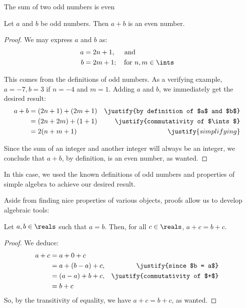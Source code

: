 \begin{expl}{The sum of two odd numbers is even}
\begin{theorem}
  Let $a$ and $b$ be odd numbers. Then $a + b$ is an even number.
\end{theorem}
\begin{proof}
We may express $a$ and $b$ as:
\begin{align*}
  a &= 2n + 1, \quad \text{ and}   \\
  b &= 2m + 1; \quad \text{for } n,m \in \ints
\end{align*}

This comes from the definitions of odd numbers. As a verifying example,
$a = -7, b = 3$ if $n = -4$ and $m = 1$. Adding $a$ and $b$, we immediately get
the desired result:
\begin{align*}
  a + b &= (2n + 1) + (2m + 1) 	& \justify{by definition of $a$ and $b$} \\
        &= (2n + 2m) + (1 + 1)  & \justify{commutativity of $\ints$} \\
        &= 2(n+m+1)				& \justify{simplifying}
\end{align*}

Since the sum of an integer and another integer will always be an integer,
we conclude that $a+b$, by definition, is an even number, as wanted.

\end{proof}

\end{expl}

In this case, we used the known definitions of odd numbers and properties of
simple algebra to achieve our desired result.


Aside from finding nice properties of various objects, proofs allow us
to develop algebraic tools:
\begin{theorem}
  Let $a, b \in \reals$ such that $a = b$. Then, for all $c \in \reals$,
  $a + c = b + c$.
\end{theorem}
\begin{proof} We deduce:
  \begin{align}
    a + c &= a + 0 + c \\
          &= a + (b - a) + c, & \justify{since $b = a$} \\
          &= (a - a) + b + c, & \justify{commutativity of $+$} \\
          &= b + c
  \end{align}
  So, by the transitivity of equality, we have $a + c = b + c$, as wanted.
\end{proof}


